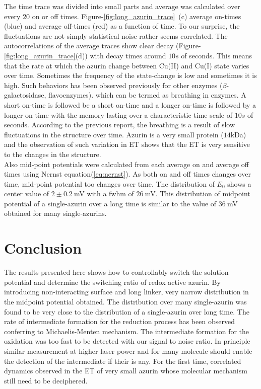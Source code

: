 The time trace was divided into small parts and average was calculated over every $20$ on or off times. Figure-\ref{fig:long_azurin_trace}~(c) average on-times (blue) and average off-times (red) as a function of time. To our surprise, the fluctuations are not simply statistical noise rather seems correlated. The autocorrelations of the average traces show clear decay (Figure-\ref{fig:long_azurin_trace}(d)) with decay times around $10s$ of seconds. This means that the rate at which the azurin change between Cu(II) and Cu(I) state varies over time. Sometimes the frequency of the state-change is low and sometimes it is high. Such behaviors has been observed previously for other enzymes ($\beta$-galactosidase, flavoenzymes).\cite{lu1998single-molecule,kou2005single-molecule,english2006ever-fluctuating} which can be termed as breathing in enzymes. A short on-time is followed be a short on-time and a longer on-time is followed by a longer on-time with the memory lasting over a characteristic time scale of $10s$ of seconds. According to the previous report, the breathing is a result of slow fluctuations in the structure over time. Azurin is a very small protein ($14$kDa) and the observation of such variation in ET shows that the ET is very sensitive to the changes in the structure.\\

Also mid-point potentials were calculated from each average on and average off times using Nernst equation(\ref{eq:nernst}). As both on and off times changes over time, mid-point potential too changes over time. The distribution of $E_0$ shows a center value of $2\pm0.2~$mV with a fwhm of $26~$mV. This distribution of midpoint potential of a single-azurin over a long time is similar to the value of $36~$mV obtained for many single-azurins.
\section{Conclusion}
The results presented here shows how to controllably switch the solution potential and determine the switching ratio of redox active azurin. By introducing non-interacting surface and long linker, very narrow distribution in the midpoint potential obtained. The distribution over many single-azurin was found to be very close to the distribution of a single-azurin over long time. The rate of intermediate formation for the reduction process has been observed conferring to Michaelis-Menten mechanism. The intermediate formation for the oxidation was too fast to be detected with our signal to noise ratio. In principle similar measurement at higher laser power and for many molecule should enable the detection of the intermediate if their is any. For the first time, correlated dynamics observed in the ET of very small azurin whose molecular mechanism still need to be deciphered.


